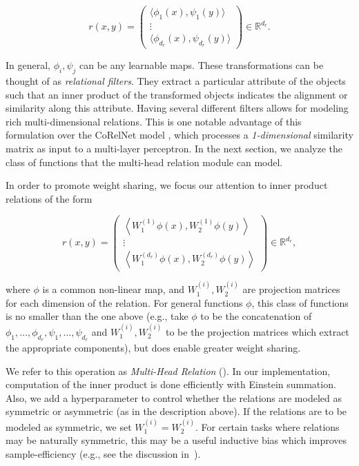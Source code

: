 \begin{equation}\label{eq:multi_head_rel}
    r(x,y) = \begin{pmatrix}\langle \phi_1(x), \psi_1(y) \rangle \\ \vdots \\ \langle \phi_{d_r}(x), \psi_{d_r}(y) \rangle \end{pmatrix} \in \mathbb{R}^{d_r}.
\end{equation}


In general, $\phi_i, \psi_j$ can be any learnable maps. These transformations can be thought of as \textit{relational filters}. They extract a particular attribute of the objects such that an inner product of the transformed objects indicates the alignment or similarity along this attribute. Having several different filters allows for modeling rich multi-dimensional relations. This is one notable advantage of this formulation over the CoRelNet model \citep{kerg2022neural}, which processes a \textit{1-dimensional} similarity matrix as input to a multi-layer perceptron. In the next section, we analyze the class of functions that the multi-head relation module can model.

In order to promote weight sharing, we focus our attention to inner product relations of the form

\begin{equation}\label{eq:inner_prod_rel_weight_sharing}
    r(x,y) = \begin{pmatrix} \left\langle W_1^{(1)}\phi(x), W_2^{(1)} \phi(y) \right\rangle \\  \vdots \\ \left\langle W_1^{(d_r)}\phi(x), W_2^{(d_r)} \phi(y) \right\rangle \end{pmatrix} \in \mathbb{R}^{d_r},
\end{equation}

\noindent where $\phi$ is a common non-linear map, and $W_1^{(i)}, W_2^{(i)}$ are projection matrices for each dimension of the relation. For general functions $\phi$, this class of functions is no smaller than the one above (e.g., take $\phi$ to be the concatenation of $\phi_1, \ldots, \phi_{d_r}, \psi_1, \ldots, \psi_{d_r}$ and $W_1^{(i)}, W_2^{(i)}$ to be the projection matrices which extract the appropriate components), but does enable greater weight sharing.

We refer to this operation as \textit{Multi-Head Relation} (). In our implementation, computation of the inner product is done efficiently with Einstein summation. Also, we add a hyperparameter to control whether the relations are modeled as symmetric or asymmetric (as in the description above). If the relations are to be modeled as symmetric, we set $W_1^{(i)} = W_2^{(i)}$. For certain tasks where relations may be naturally symmetric, this may be a useful inductive bias which improves sample-efficiency (e.g., see the discussion in~\cite{kerg2022neural}).

